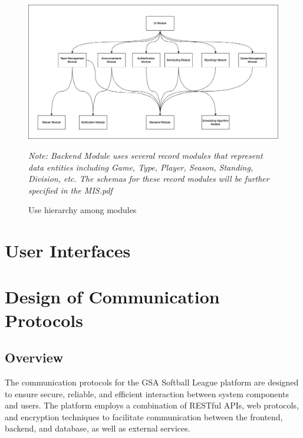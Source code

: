 \documentclass[12pt, titlepage]{article}
\begin{document}
\begin{figure}[H]
\centering
\includegraphics[width=1.1\textwidth]{module-decomp.png}
\caption{Use hierarchy among modules}
\textit{Note: Backend Module uses several record modules that represent data entities including Game, Type, Player, Season, Standing, Division, etc. The schemas for these record modules will be further specified in the MIS.pdf}
\label{FigUH}
\end{figure}


\section{User Interfaces}


\section{Design of Communication Protocols}

\subsection*{Overview}
The communication protocols for the GSA Softball League platform are designed to ensure secure, reliable, and efficient interaction between system components and users. The platform employs a combination of RESTful APIs, web protocols, and encryption techniques to facilitate communication between the frontend, backend, and database, as well as external services.
\end{document}
